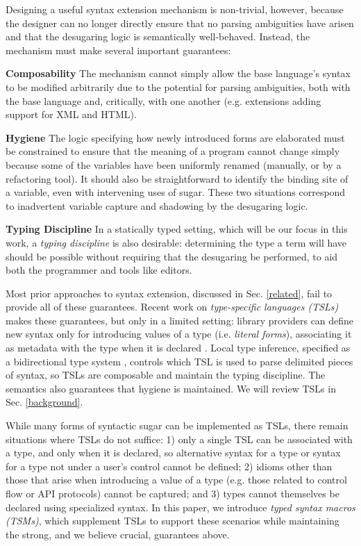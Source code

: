 \documentclass{sig-alternate}
\begin{document}
Designing a useful syntax extension mechanism is non-trivial, however, because the designer can no longer  directly ensure that no parsing ambiguities have arisen and that the desugaring logic is semantically well-behaved. Instead, the mechanism must make several important guarantees:

\noindent
\textbf{Composability} The mechanism cannot simply allow the base language's syntax to  be modified arbitrarily due to the potential for parsing ambiguities, both with the base language and, critically, with one another (e.g. extensions adding support for XML and HTML).%

\noindent
\textbf{Hygiene} The logic specifying how newly introduced forms are elaborated must be constrained to ensure that the meaning of a program cannot change simply because some of the variables have been uniformly renamed (manually, or by a refactoring tool). It should also be straightforward to identify the binding site of a variable, even with intervening uses of sugar. These two situations correspond to inadvertent variable capture and shadowing by the desugaring logic. 

\noindent
\textbf{Typing Discipline} In a statically typed setting, which will be our focus in this work, a \emph{typing discipline} is also desirable: determining the type a term will have should be possible without requiring that the desugaring be performed, to aid both the programmer and tools like editors. 

Most prior approaches to syntax extension, discussed in Sec. \ref{related}, fail to provide all of these guarantees. Recent work on \emph{type-specific languages  (TSLs)} makes these guarantees, but only in a limited setting: library providers can define new syntax only for introducing values of a type (i.e. \emph{literal forms}), associating it as metadata with the type when it is declared \cite{TSLs}. Local type inference, specified as a bidirectional type system \cite{Pierce:2000:LTI:345099.345100}, controls which TSL is used to parse delimited pieces of syntax, so TSLs are composable and maintain the typing discipline. The semantics also guarantees that hygiene is maintained. We will review TSLs in Sec. \ref{background}. 

While many forms of syntactic sugar can be implemented as TSLs, there remain situations where TSLs do not suffice: 1) only a single TSL can be associated with a type, and only when it is declared, so alternative syntax for a type or syntax for a type not under a user's control cannot be defined; 2) idioms other than those that arise when introducing a value of a type (e.g. those related to control flow or API protocols) cannot be captured; and 3) types cannot themselves be declared using specialized syntax. In this paper, we introduce \emph{typed syntax macros (TSMs)}, which supplement TSLs to support these scenarios while maintaining the strong, and we believe crucial, guarantees above.%
\end{document}
